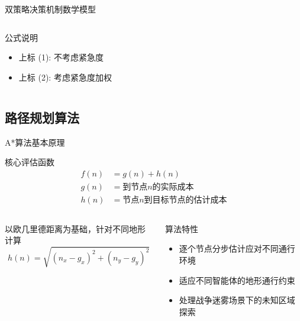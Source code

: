 \documentclass[
10pt,
aspectratio=169,
]{beamer}
\begin{document}
\begin{frame}{双策略决策机制数学模型}
\begin{columns}[T]
\begin{column}{0.48\textwidth}
            
            \begin{block}{公式说明}
                \begin{itemize}
                    \item 上标 (1): 不考虑紧急度
                    \item 上标 (2): 考虑紧急度加权

                \end{itemize}
            \end{block}
        \end{column}
    \end{columns}
    
    
\end{frame}



\subsection{路径规划算法}
\begin{frame}{A*算法基本原理}
    \begin{alertblock}{核心评估函数}
        \begin{align}
            f(n) &= g(n) + h(n) \\
            g(n) &= \text{到节点}n\text{的实际成本} \\
            h(n) &= \text{节点}n\text{到目标节点的估计成本}
        \end{align}
    \end{alertblock}
    
    \begin{columns}
        \begin{column}{0.5\textwidth}
            \begin{exampleblock}{以欧几里德距离为基础，针对不同地形计算}
                \begin{equation}
                    h(n) = \sqrt{(n_x - g_x)^2 + (n_y - g_y)^2}
                \end{equation}
                
                
            \end{exampleblock}
        \end{column}
        \begin{column}{0.5\textwidth}
            \begin{alertblock}{算法特性}
                \begin{itemize}
                    \item 逐个节点分步估计应对不同通行环境
\item 适应不同智能体的地形通行约束 
\item 处理战争迷雾场景下的未知区域探索
                \end{itemize}
            \end{alertblock}
        \end{column}
    \end{columns}
\end{frame}
\end{document}
